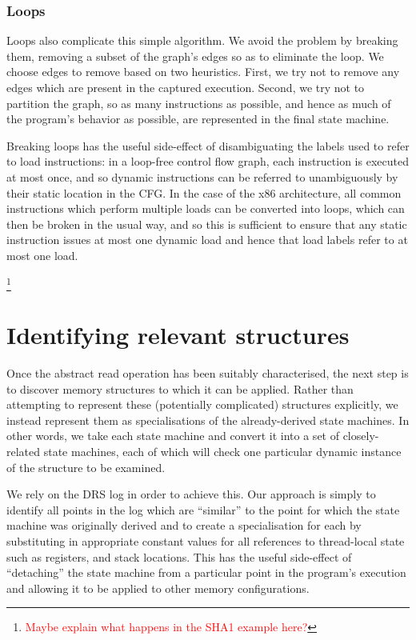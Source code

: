 \documentclass[10pt,twocolumn,preprint,natbib,authoryear]{sigplanconf}
\newcommand{\editorial}[1]{\textcolor{red}{\footnote{\textcolor{red}{#1}}}}
\begin{document}
\subsubsection{Loops}
Loops also complicate this simple algorithm.  We avoid the problem by
breaking them, removing a subset of the graph's edges so as to
eliminate the loop.  We choose edges to remove based on two
heuristics.  First, we try not to remove any edges which are present
in the captured execution.  Second, we try not to partition the graph,
so as many instructions as possible, and hence as much of the
program's behavior as possible, are represented in the final state
machine.

Breaking loops has the useful side-effect of disambiguating the labels
used to refer to load instructions: in a loop-free control flow graph,
each instruction is executed at most once, and so dynamic instructions
can be referred to unambiguously by their static location in the CFG.
In the case of the x86 architecture, all common instructions which
perform multiple loads can be converted into loops, which can then be
broken in the usual way, and so this is sufficient to ensure that any
static instruction issues at most one dynamic load and hence that load
labels refer to at most one load.

\editorial{Maybe explain what happens in the SHA1 example here?}

\section{Identifying relevant structures}

Once the abstract read operation has been suitably characterised, the
next step is to discover memory structures to which it can be applied.
Rather than attempting to represent these (potentially complicated)
structures explicitly, we instead represent them as specialisations of
the already-derived state machines.  In other words, we take each
state machine and convert it into a set of closely-related state
machines, each of which will check one particular dynamic instance of
the structure to be examined.

We rely on the DRS log in order to achieve this.  Our approach is
simply to identify all points in the log which are ``similar'' to the
point for which the state machine was originally derived and to create
a specialisation for each by substituting in appropriate constant
values for all references to thread-local state such as registers, and
stack locations.  This has the useful side-effect of ``detaching'' the
state machine from a particular point in the program's execution and
allowing it to be applied to other memory configurations.
\end{document}
